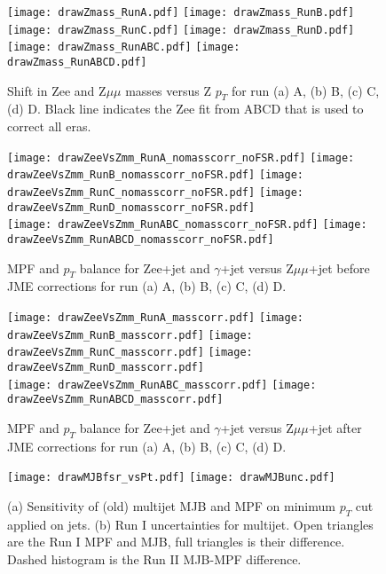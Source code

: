 \documentclass[landscape,10pt]{beamer} %
\begin{document}
\newpage
\begin{figure}[htp!]
  \centering
  \texttt{[image: drawZmass\_RunA.pdf]}
  \texttt{[image: drawZmass\_RunB.pdf]}
  \texttt{[image: drawZmass\_RunC.pdf]}
  \texttt{[image: drawZmass\_RunD.pdf]}\\
  \texttt{[image: drawZmass\_RunABC.pdf]}
  \texttt{[image: drawZmass\_RunABCD.pdf]}
\caption{Shift in Zee and Z$\mu\mu$ masses versus Z $p_T$ for run (a) A, (b) B, (c) C, (d) D. Black line indicates the Zee fit from ABCD that is used to correct all eras.}
\end{figure}

\newpage
\begin{figure}[htp!]
\centering
  \texttt{[image: drawZeeVsZmm\_RunA\_nomasscorr\_noFSR.pdf]}
  \texttt{[image: drawZeeVsZmm\_RunB\_nomasscorr\_noFSR.pdf]}
  \texttt{[image: drawZeeVsZmm\_RunC\_nomasscorr\_noFSR.pdf]}
  \texttt{[image: drawZeeVsZmm\_RunD\_nomasscorr\_noFSR.pdf]}\\
  \texttt{[image: drawZeeVsZmm\_RunABC\_nomasscorr\_noFSR.pdf]}
  \texttt{[image: drawZeeVsZmm\_RunABCD\_nomasscorr\_noFSR.pdf]}
\caption{MPF and $p_T$ balance for Zee+jet and $\gamma$+jet versus Z$\mu\mu$+jet before JME corrections for run (a) A, (b) B, (c) C, (d) D.}
\end{figure}

\newpage
\begin{figure}[htp!]
\centering
 \texttt{[image: drawZeeVsZmm\_RunA\_masscorr.pdf]}
 \texttt{[image: drawZeeVsZmm\_RunB\_masscorr.pdf]}
 \texttt{[image: drawZeeVsZmm\_RunC\_masscorr.pdf]}
 \texttt{[image: drawZeeVsZmm\_RunD\_masscorr.pdf]}\\
 \texttt{[image: drawZeeVsZmm\_RunABC\_masscorr.pdf]}
 \texttt{[image: drawZeeVsZmm\_RunABCD\_masscorr.pdf]}
\caption{MPF and $p_T$ balance for Zee+jet and $\gamma$+jet versus Z$\mu\mu$+jet after JME corrections for run (a) A, (b) B, (c) C, (d) D.}
\end{figure}

\newpage
\begin{figure}[p]
\centering
\texttt{[image: drawMJBfsr\_vsPt.pdf]}
\texttt{[image: drawMJBunc.pdf]}
\caption{
(a) Sensitivity of (old) multijet MJB and MPF on minimum $p_T$ cut applied on jets.
(b) Run I uncertainties for multijet. Open triangles are the Run I MPF and MJB, full triangles is their difference. Dashed histogram is the Run II MJB-MPF difference.}
\end{figure}
\end{document}
